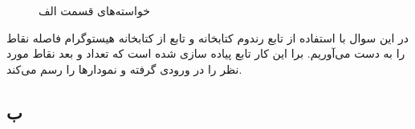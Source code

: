 \documentclass[12pt,onecolumn,a4paper]{article}
\begin{document}
\begin{figure}[h!]
{    }
    \caption{خواسته‌های قسمت الف}
    \label{fig:9}
\end{figure}

در این سوال با استفاده از تابع رندوم کتابخانه  و تابع  از کتابخانه  هیستوگرام فاصله نقاط را به دست می‌آوریم. برا این کار تابع  پیاده سازی شده است که تعداد و بعد نقاط مورد نظر را در ورودی گرفته و نمودارها را رسم می‌کند.

\subsection*{ب}
\end{document}
